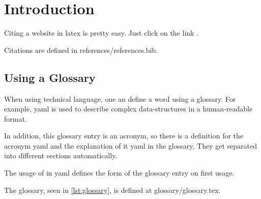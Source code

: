 \section{Introduction}
\label{sec:introduction}

Citing a website in latex is pretty easy.
Just click on the link \cite{asherelbeinWhenIsaBirdaBirb}.

Citations are defined in references/references.bib.

\subsection{Using a Glossary}

When using technical language, one an define a word using a glossary.
For example, \gls{yaml} is used to describe complex data-structures in
a human-readable format.

In addition, this glossary entry is an acronym, so there is a definition for
the acronym \gls{yaml} and the explanation of it \gls{yaml} in the glossary.
They get separated into different sections automatically.

The usage of  in \gls{yaml} defines the form of the glossary entry on
first usage.

The glossary, seen in \cref{lst:glossary}, is defined at glossary/glossary.tex.


